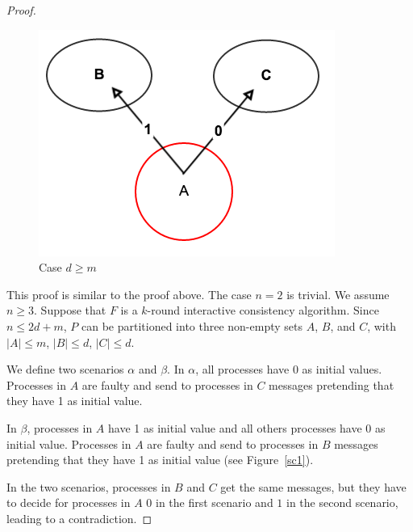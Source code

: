 \begin{proof}
\begin{figure}[h]
  \centering
  \includegraphics[scale=0.35]{impossible2.png}
  \caption{Case $d \geqslant m$  }
\end{figure}\label{sc2}

  This proof is similar to the proof above. 
  The case $n=2$ is trivial. We assume $n \geqslant 3$.
  Suppose that $F$ is a $k$-round  interactive
  consistency algorithm. Since $n \leqslant 2d+m$, $P$ can be partitioned into
  three non-empty sets $A$, $B$, and $C$, with $| A | \leqslant m$, $| B | \leqslant d$, $| C |
  \leqslant d$. 
  
   We define two scenarios $\alpha$ and $\beta$.
  In $\alpha$, all processes have 0 as initial values.
  Processes in $A$ are faulty and send to processes in $C$  messages
  pretending that they have  1 as initial value. 
  
   In $\beta$, processes in $A$ have 1 as initial value and all  others processes have 0 as initial value.
  Processes in $A$ are faulty and send to processes in $B$ messages 
  pretending that they have 1 as initial value (see Figure~\ref{sc1}).
  
  In the two scenarios, processes in $B$ and $C$  get the same messages, but they have to decide for processes in $A$ $0$ in the first scenario 
  and $1$ in the second scenario, leading to a contradiction.
    

\end{proof}
